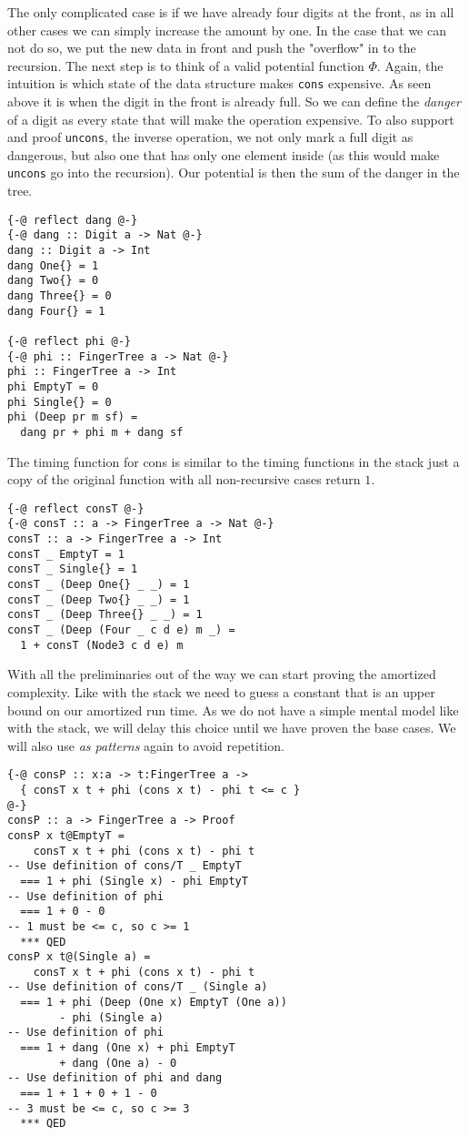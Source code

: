\documentclass[sigplan,screen]{acmart}
\begin{document}
The only complicated case is if we have already four digits at the front, as in all other cases we can simply increase the amount by one. In the case that we can not do so, we put the new data in front and push the "overflow" in to the recursion. The next step is to think of a valid potential function $\Phi$. Again, the intuition is which state of the data structure makes \texttt{cons} expensive. As seen above it is when the digit in the front is already full. So we can define the \textit{danger} of a digit as every state that will make the operation expensive. To also support and proof \texttt{uncons}, the inverse operation, we not only mark a full digit as dangerous, but also one that has only one element inside (as this would make \texttt{uncons} go into the recursion). Our potential is then the sum of the danger in the tree.

\begin{lstlisting}
{-@ reflect dang @-}
{-@ dang :: Digit a -> Nat @-}
dang :: Digit a -> Int
dang One{} = 1
dang Two{} = 0
dang Three{} = 0
dang Four{} = 1

{-@ reflect phi @-}
{-@ phi :: FingerTree a -> Nat @-}
phi :: FingerTree a -> Int
phi EmptyT = 0
phi Single{} = 0
phi (Deep pr m sf) =
  dang pr + phi m + dang sf
\end{lstlisting}

The timing function for cons is similar to the timing functions in the stack just a copy of the original function with all non-recursive cases return $1$.

\begin{lstlisting}
{-@ reflect consT @-}
{-@ consT :: a -> FingerTree a -> Nat @-}
consT :: a -> FingerTree a -> Int
consT _ EmptyT = 1
consT _ Single{} = 1
consT _ (Deep One{} _ _) = 1
consT _ (Deep Two{} _ _) = 1
consT _ (Deep Three{} _ _) = 1
consT _ (Deep (Four _ c d e) m _) =
  1 + consT (Node3 c d e) m
\end{lstlisting}

With all the preliminaries out of the way we can start proving the amortized complexity. Like with the stack we need to guess a constant that is an upper bound on our amortized run time. As we do not have a simple mental model like with the stack, we will delay this choice until we have proven the base cases. We will also use \textit{as patterns} again to avoid repetition.

\begin{lstlisting}
{-@ consP :: x:a -> t:FingerTree a ->
  { consT x t + phi (cons x t) - phi t <= c }
@-}
consP :: a -> FingerTree a -> Proof
consP x t@EmptyT =
    consT x t + phi (cons x t) - phi t
-- Use definition of cons/T _ EmptyT
  === 1 + phi (Single x) - phi EmptyT
-- Use definition of phi
  === 1 + 0 - 0
-- 1 must be <= c, so c >= 1
  *** QED
consP x t@(Single a) =
    consT x t + phi (cons x t) - phi t
-- Use definition of cons/T _ (Single a)
  === 1 + phi (Deep (One x) EmptyT (One a))
        - phi (Single a)
-- Use definition of phi
  === 1 + dang (One x) + phi EmptyT
        + dang (One a) - 0
-- Use definition of phi and dang
  === 1 + 1 + 0 + 1 - 0
-- 3 must be <= c, so c >= 3
  *** QED
\end{lstlisting}
\end{document}
